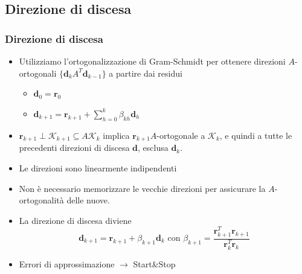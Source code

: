 \documentclass[10pt]{beamer}
\begin{document}
\subsection{Direzione di discesa}
\begin{frame} \frametitle{Direzione di discesa}
\begin{itemize}
\item Utilizziamo l'\alert{ortogonalizzazione di Gram-Schmidt} per ottenere direzioni %
$A$-ortogonali $\{\mathbf{d}_kA^T\mathbf{d}_{k-1}\}$ a partire dai residui 
\begin{itemize}
\item $\mathbf{d}_0=\mathbf{r}_0$
\item $\mathbf{d}_{k+1}=\mathbf{r}_{k+1}+\sum_{h=0}^k\beta_{kh}\mathbf{d}_h$
\end{itemize}
\item $\mathbf{r}_{k+1} \perp \mathcal{K}_{k+1} \subseteq A\mathcal{K}_k$ implica $\mathbf{r}_{k+1} A$-ortogonale a $\mathcal{K}_k$, e quindi a tutte le precedenti direzioni di discesa $\mathbf{d}$, esclusa $\mathbf{d}_k$. 
\item Le direzioni sono \alert{linearmente indipendenti}
\item \alert{Non è necessario memorizzare le vecchie direzioni} per assicurare la $A$-ortogonalità delle nuove.
\item La \alert{direzione di discesa} diviene
$$
\mathbf{d}_{k+1}=\mathbf{r}_{k+1}+\beta_{k+1}\mathbf{d}_k
\text{ con }\beta_{k+1}=\frac{\mathbf{r}_{k+1}^T\mathbf{r}_{k+1}}{\mathbf{r}_{k}^T\mathbf{r}_{k}}
$$
\item Errori di approssimazione $\rightarrow$ Start\&Stop
\end{itemize}
\end{frame}


    
\end{document}
